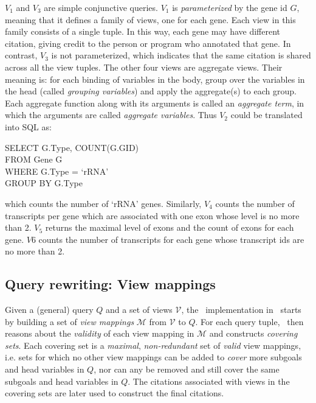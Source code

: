 $V_1$ and $V_3$ are simple conjunctive queries. %
$V_1$ is \textit{parameterized} by the gene id $G$, meaning that it defines a family of views, one for each gene. Each view in this family consists of a single tuple.  In this way, each gene may have different citation, giving credit to the person or program who annotated that gene. 
In contrast, $V_3$ is not parameterized, which indicates that the same citation is shared across all the view tuples.
The other four views are aggregate views. Their meaning is: for each binding of variables in the body, group over the variables  in the head (called {\em grouping variables}) and apply the aggregate(s) to each group. Each {aggregate function} along with its arguments is called an {\em aggregate term}, in which the arguments are called {\em aggregate variables}.
Thus $V_2$ could be translated into SQL as:
\begin{tabbing}
SELECT G.Type, COUNT(G.GID)\\
FROM Gene G\\
WHERE G.Type = `rRNA'\\
GROUP BY G.Type
\end{tabbing}
which counts the number of `rRNA' genes. Similarly, $V_4$ counts the number of transcripts per gene which are associated with one exon whose level is no more than 2.
$V_5$ returns the maximal level of exons and the count of exons for each gene.
$V6$ counts the number of transcripts for each gene whose transcript ids are no more than 2.

\subsection{Query rewriting:  View mappings}
\label{sec: conjunctive_example}
Given a (general) query $Q$ and a set of views $\mathcal{V}$, the \rba\ implementation in~\cite{wu2018data} starts by building a set of \textit{view mappings} $\mathcal{M}$ from $\mathcal{V}$ to $Q$. For each query tuple, \rba\ then reasons about the {\em validity} of each view mapping in $\mathcal{M}$ and constructs {\em covering sets}. Each covering set is a \textit{maximal}, \textit{non-redundant} set of {\em valid} view mappings,
i.e. sets for which no other view mappings can be added to \textit{cover} more subgoals and head variables in $Q$, nor can any be removed and still {cover} the same subgoals and head variables in $Q$.  The citations associated with views in the covering sets are later used to construct the final citations.

